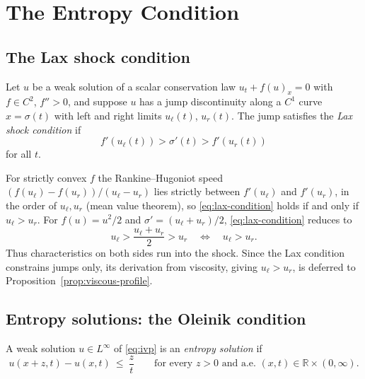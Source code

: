 \section{The Entropy Condition}
\label{sec:entropy-condition}

\subsection{The Lax shock condition}
\label{subsec:lax-condition}

\begin{definition}
\label{def:lax}
Let $u$ be a weak solution of a scalar conservation law $u_t+f(u)_x=0$
with $f\in C^2$, $f''>0$, and suppose $u$ has a jump discontinuity along a $C^1$
curve $x=\sigma(t)$ with left and right limits $u_\ell(t)$, $u_r(t)$. The jump
satisfies the \emph{Lax shock condition} if
\begin{equation}
  \label{eq:lax-condition}
  f'(u_\ell(t)) > \sigma'(t) > f'(u_r(t))
\end{equation}
for all $t$.
\end{definition}

For strictly convex $f$ the Rankine--Hugoniot speed $(f(u_\ell)-f(u_r))/(u_\ell-u_r)$
lies strictly between $f'(u_\ell)$ and $f'(u_r)$, in the order of $u_\ell,u_r$
(mean value theorem), so \eqref{eq:lax-condition} holds if and only if
$u_\ell>u_r$. For $f(u)=u^2/2$ and $\sigma'=(u_\ell+u_r)/2$, \eqref{eq:lax-condition} reduces to
\begin{equation}
  \label{eq:lax-burgers}
  u_\ell > \frac{u_\ell+u_r}{2} > u_r
  \quad \Longleftrightarrow \quad
  u_\ell > u_r.
\end{equation}
Thus characteristics on both sides run into the shock. Since the Lax condition
constrains jumps only, its derivation from viscosity, giving $u_\ell>u_r$, is
deferred to Proposition~\ref{prop:viscous-profile}.

\subsection{Entropy solutions: the Oleinik condition}
\label{subsec:oleinik}

\begin{definition}
\label{def:entropy-solution}
A weak solution $u\in L^\infty$ of \eqref{eq:ivp} is an \emph{entropy
solution} if
\begin{equation}
  \label{eq:oleinik}
  u(x+z,t)-u(x,t)\ \le\ \frac{z}{t}
  \qquad\text{for every }z>0\text{ and a.e.\ }(x,t)\in\mathbb{R}\times(0,\infty).
\end{equation}
\end{definition}

